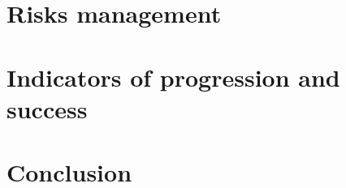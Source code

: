 \documentclass{article}
\begin{document}

\section{Risks management}
\label{risk-management}


\section{Indicators of progression and success}


\section{Conclusion}
\end{document}
